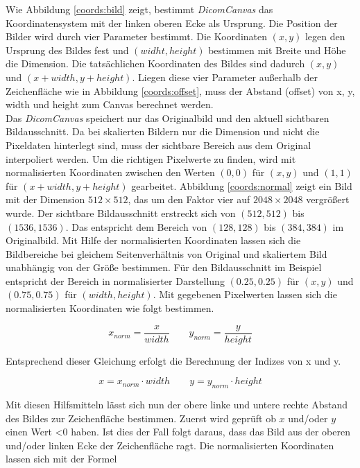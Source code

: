 Wie Abbildung \ref{coords:bild} zeigt, bestimmt \textit{DicomCanvas} das Koordinatensystem mit der linken oberen Ecke als Ursprung. Die Position der Bilder wird durch vier Parameter bestimmt. Die Koordinaten $(x, y)$ legen den Ursprung des Bildes fest und $(widht, height)$ bestimmen mit Breite und Höhe die Dimension. Die tatsächlichen Koordinaten des Bildes sind dadurch $(x, y)$ und $(x+width, y+height)$. Liegen diese vier Parameter außerhalb der Zeichenfläche wie in Abbildung \ref{coords:offset}, muss der Abstand (offset) von x, y, width und height zum Canvas berechnet werden.\\
Das \textit{DicomCanvas} speichert nur das Originalbild und den aktuell sichtbaren Bildausschnitt. Da bei skalierten Bildern nur die Dimension und nicht die Pixeldaten hinterlegt sind, muss der sichtbare Bereich aus dem Original interpoliert werden. Um die richtigen Pixelwerte zu finden, wird mit normalisierten Koordinaten zwischen den Werten $(0, 0)$ für $(x,y)$ und $(1, 1)$ für $(x+width, y+height)$ gearbeitet. Abbildung \ref{coords:normal} zeigt ein Bild mit der Dimension $512 \times 512$, das um den Faktor vier auf $2048\times2048$ vergrößert wurde. Der sichtbare Bildausschnitt erstreckt sich von $(512, 512)$ bis $(1536, 1536)$. Das entspricht dem Bereich von $(128, 128)$ bis $(384, 384)$ im Originalbild. Mit Hilfe der normalisierten Koordinaten lassen sich die Bildbereiche bei gleichem Seitenverhältnis von Original und skaliertem Bild unabhängig von der Größe bestimmen. Für den Bildausschnitt im Beispiel entspricht der Bereich in normalisierter Darstellung $(0.25, 0.25)$ für $(x,y)$ und $(0.75, 0.75)$ für $(width, height)$. Mit gegebenen Pixelwerten lassen sich die normalisierten Koordinaten wie folgt bestimmen.

\begin{equation}
 x_{norm} = \frac{x}{width} \qquad
 y_{norm} = \frac{y}{height}
\end{equation}

Entsprechend dieser Gleichung erfolgt die Berechnung der Indizes von x und y.

\begin{equation}
 x = x_{norm} \cdot width \qquad
 y = y_{norm} \cdot height
\end{equation}

Mit diesen Hilfsmitteln lässt sich nun der obere linke und untere rechte Abstand des Bildes zur Zeichenfläche bestimmen. Zuerst wird geprüft ob $x$ und/oder $y$ einen Wert \textless 0 haben. Ist dies der Fall folgt daraus, dass das Bild aus der oberen und/oder linken Ecke der Zeichenfläche ragt. Die normalisierten Koordinaten lassen sich mit der Formel

